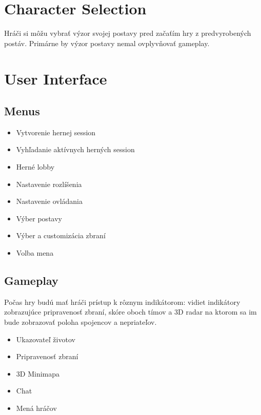 \documentclass[a4paper]{report}
\begin{document}
\section{Character Selection}
 Hráči si môžu vybrať výzor svojej postavy pred začaťím hry z predvyrobených postáv. Primárne by výzor postavy nemal ovplyvňovať gameplay. 

\section{User Interface}
\subsection{Menus}
\begin{itemize}
  \item Vytvorenie hernej session
  \item Vyhľadanie aktívnych herných session
  \item Herné lobby
  \item Nastavenie rozlíšenia
  \item Nastavenie ovládania
  \item Výber postavy
  \item Výber a customizácia zbraní
  \item Volba mena
\end{itemize}
 
\subsection{Gameplay}
Počas hry budú mať hráči prístup k rôznym indikátorom: vidiet indikátory zobrazujúce pripravenosť zbraní, skóre oboch tímov a 3D radar na ktorom sa im bude zobrazovať poloha spojencov a nepriateľov.
\begin{itemize}
  \item Ukazovateľ životov
  \item Pripravenosť zbraní
  \item 3D Minimapa
  \item Chat
  \item Mená hráčov
\end{itemize} 
\end{document}
